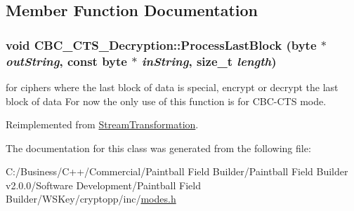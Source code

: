 \subsection{Member Function Documentation}
\hypertarget{class_c_b_c___c_t_s___decryption_a2f23aad280dc56920f16ea0711b39d89}{
\subsubsection[{ProcessLastBlock}]{\setlength{\rightskip}{0pt plus 5cm}void CBC\_\-CTS\_\-Decryption::ProcessLastBlock (byte $\ast$ {\em outString}, \/  const byte $\ast$ {\em inString}, \/  size\_\-t {\em length})}}
\label{class_c_b_c___c_t_s___decryption_a2f23aad280dc56920f16ea0711b39d89}


for ciphers where the last block of data is special, encrypt or decrypt the last block of data For now the only use of this function is for CBC-\/CTS mode. 

Reimplemented from \hyperlink{class_stream_transformation_a31556c19e6e689cfc5c35ea3b3d32c36}{StreamTransformation}.

The documentation for this class was generated from the following file:\begin{DoxyCompactItemize}
\item 
C:/Business/C++/Commercial/Paintball Field Builder/Paintball Field Builder v2.0.0/Software Development/Paintball Field Builder/WSKey/cryptopp/inc/\hyperlink{modes_8h}{modes.h}\end{DoxyCompactItemize}
